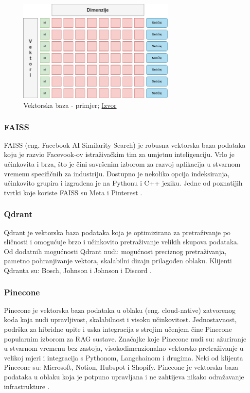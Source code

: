 \documentclass[]{foi}
\begin{document}
\begin{figure}[h]
  \centering
  \includegraphics[width=0.7\textwidth]{./assets/payload.png}
  \caption{Vektorska baza - primjer; \href{https://tinyurl.com/469fzf35}{Izvor}}
  \label{fig:slika10}
\end{figure}

\subsubsection{FAISS}
FAISS (eng. Facebook AI Similarity Search) je robusna vektorska baza podataka koju je razvio Facevook-ov istraživačkim tim za umjetnu inteligenciju. Vrlo je učinkovita i brza, što je čini 
savršenim izborom za razvoj aplikacija u stvarnom vremenu specifičnih za industriju. Dostupno je nekoliko opcija indeksiranja, učinkovito grupira i izgrađena je 
na Pythonu i C++ jeziku. Jedne od poznatijih tvrtki koje koriste FAISS su Meta i Pinterest \cite{baghel2025vectors}. 

\subsubsection{Qdrant}
Qdrant je vektorska baza podataka koja je optimizirana za pretraživanje po sličnosti i omogućuje brzo i učinkovito pretraživanje velikih skupova podataka. Od dodatnih mogućnosti Qdrant nudi:
mogućnost preciznog pretraživanja, pametno pohranjivanje vektora, skalabilni dizajn prilagođen oblaku. Klijenti Qdranta su: Bosch, Johnson i Johnson i Discord \cite{baghel2025vectors}.

\subsubsection{Pinecone}
Pinecone je vektorska baza podataka u oblaku (eng. cloud-native) zatvorenog koda koja nudi upravljivost, skalabilnost i visoku učinkovitost. Jednostavnost, podrška za hibridne upite i uska integracija s strojim učenjem čine Pinecone 
popularnim izborom za RAG sustave. Značajke koje Pinecone nudi su: ažuriranje u stvarnom vremenu bez zastoja, visokodimenzionalno vektorsko pretraživanje u velikoj mjeri i integracija s Pythonom, Langchainom i drugima.
Neki od klijenta Pinecone su: Microsoft, Notion, Hubspot i Shopify.
Pinecone je vektorska baza podataka u oblaku koja je potpuno upravljana i ne zahtijeva nikako odražavanje infrastrukture \cite{baghel2025vectors}. 
\end{document}
